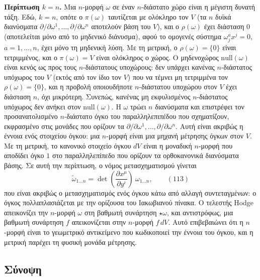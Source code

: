 \documentclass[12pt]{article}
\begin{document}
\textbf{Περίπτωση $k=n$.} Μια $n$-μορφή $\omega$ σε έναν $n$-διάστατο χώρο είναι η μέγιστη δυνατή τάξη. Εδώ, $k=n$, οπότε ο $\pi(\omega)$ ταυτίζεται με ολόκληρο τον $V$ (τα $n$ δυϊκά διανύσματα $\partial / \partial \omega^1, \dots, \partial / \partial \omega^n$ αποτελούν βάση του $V$), και ο $\rho(\omega)$ έχει διάσταση $0$ (αποτελείται μόνο από το μηδενικό διάνυσμα), αφού το ομογενές σύστημα $\omega^a_j x^j = 0$, $a = 1, \dots, n$, έχει μόνο τη μηδενική λύση. Με τη μετρική, ο $\rho(\omega) = \{0\}$ είναι τετριμμένος, και ο $\pi(\omega) = V$ είναι ολόκληρος ο χώρος. Ο μηδενοχώρος $\text{null}(\omega)$ είναι κενός ως προς τους $n$-διάστατους υποχώρους: δεν υπάρχει κανένας $n$-διάστατος υπόχωρος του $V$ (εκτός από τον ίδιο τον $V$) που να τέμνει μη τετριμμένα τον $\rho(\omega) = \{0\}$, και η προβολή οποιουδήποτε $n$-διάστατου υποχώρου στον $V$ έχει διάσταση $n$, όχι μικρότερη. Συνεπώς, κανένας μη εκφυλισμένος $n$-διάστατος υπόχωρος δεν ανήκει στον $\text{null}(\omega)$. Η $\omega$ τρώει $n$ διανύσματα και επιστρέφει τον προσανατολισμένο $n$-διάστατο όγκο του παραλληλεπιπέδου που σχηματίζουν, εκφρασμένο στις μονάδες που ορίζουν τα $\partial / \partial \omega^1, \dots, \partial / \partial \omega^n$. Αυτή είναι ακριβώς η έννοια ενός στοιχείου όγκου: μια $n$-μορφή είναι μια μηχανή μέτρησης όγκων στον $V$. Με τη μετρική, το κανονικό στοιχείο όγκου $dV$ είναι η μοναδική $n$-μορφή που αποδίδει όγκο $1$ στο παραλληλεπίπεδο που ορίζουν τα ορθοκανονικά διανύσματα βάσης. Σε αυτή την περίπτωση, ο νόμος μετασχηματισμού γίνεται
\begin{equation}
\tilde{\omega}_{1 \dots n} = \det \left( \frac{\partial x^\mu}{\partial y^i} \right) \ \omega_{1 \dots n}, \qquad (113)
\end{equation}
που είναι ακριβώς ο μετασχηματισμός ενός όγκου κάτω από αλλαγή συντεταγμένων: ο όγκος πολλαπλασιάζεται με την ορίζουσα του Ιακωβιανού πίνακα. Ο τελεστής Hodge απεικονίζει την $n$-μορφή $\omega$ στη βαθμωτή συνάρτηση $\star \omega$, και αντιστρόφως, μια βαθμωτή συνάρτηση $f$ απεικονίζεται στην $n$-μορφή $f \, dV$. Αυτό επιβεβαιώνει ότι η $n$-μορφή είναι το γεωμετρικό αντικείμενο που κωδικοποιεί την έννοια του όγκου, και η μετρική παρέχει τη φυσική μονάδα μέτρησης.

\subsection{Σύνοψη}
\end{document}
